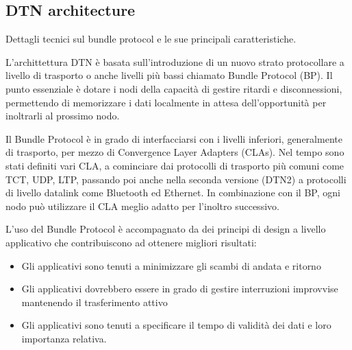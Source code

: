 \documentclass[a4paper]{article}
\begin{document}
		
		\subsection{DTN architecture}
		{\sc Dettagli tecnici sul bundle protocol e le sue principali caratteristiche.}
		
		L'archittettura DTN è basata sull'introduzione di un nuovo strato protocollare a livello di trasporto o anche livelli più bassi chiamato Bundle Protocol (BP). Il punto essenziale è dotare i nodi della capacità di gestire ritardi e disconnessioni, permettendo di memorizzare i dati localmente in attesa dell'opportunità per inoltrarli al prossimo nodo. 
		
		Il Bundle Protocol è in grado di interfacciarsi con i livelli inferiori, generalmente di trasporto, per mezzo di Convergence Layer Adapters (CLAs). Nel tempo sono stati definiti vari CLA, a cominciare dai protocolli di trasporto più comuni come TCT, UDP, LTP, passando poi anche nella seconda versione (DTN2) a protocolli di livello datalink come Bluetooth ed Ethernet. 
		In combinazione con il BP, ogni nodo può utilizzare il CLA meglio adatto per l'inoltro successivo. 
		
		L'uso del Bundle Protocol è accompagnato da dei principi di design a livello applicativo che contribuiscono ad ottenere migliori risultati:
		\begin{itemize}
			\item Gli applicativi sono tenuti a minimizzare gli scambi di andata e ritorno
			\item Gli applicativi dovrebbero essere in grado di gestire interruzioni improvvise mantenendo il trasferimento attivo
			\item Gli applicativi sono tenuti a specificare il tempo di validità dei dati e loro importanza relativa.
		\end{itemize}
		
\end{document}
